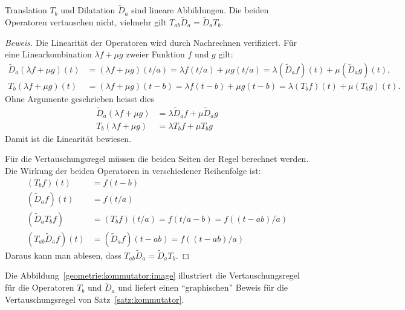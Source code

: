 \begin{satz}
\label{satz:kommutator}
Translation $T_b$ und Dilatation $\tilde{D}_a$ sind lineare Abbildungen.
Die beiden Operatoren vertauschen nicht, vielmehr gilt
$T_{ab}\tilde{D}_a = \tilde{D}_aT_b$.
\end{satz}
%

\begin{proof}[Beweis]
Die Linearität der Operatoren wird durch Nachrechnen verifiziert.
Für eine Linearkombination $\lambda f+\mu g$ zweier Funktion $f$ und $g$ gilt:
\begin{align*}
\tilde{D}_a(\lambda f+\mu g)(t)
&=
(\lambda f+\mu g)(t/a)
=
\lambda f(t/a)+\mu g(t/a)
=
\lambda (\tilde{D}_af)(t)+\mu (\tilde{D}_ag)(t),
\\
T_b(\lambda f+ \mu g)(t)
&=
(\lambda f+\mu g)(t-b)
=
\lambda f(t-b)+\mu g(t-b)
=
\lambda (T_bf)(t)+\mu (T_bg)(t).
\end{align*}
Ohne Argumente geschrieben heisst dies
\begin{align*}
\tilde{D}_a(\lambda f+\mu g) &= \lambda \tilde{D}_af + \mu \tilde{D}_ag
\\
T_b(\lambda f+\mu g) &= \lambda T_bf + \mu T_bg
\end{align*}
Damit ist die Linearität bewiesen.

Für die Vertauschungsregel müssen die beiden Seiten der Regel
berechnet werden.
Die Wirkung der beiden Operatoren in verschiedener Reihenfolge
ist:
\begin{align*}
(T_bf)(t)
&=
f(t-b)
\\
(\tilde{D}_af)(t)
&=
f(t/a)
\\
(\tilde{D}_aT_bf)
&=
(T_bf)(t/a)
=
f(t/a-b)
=
f((t-ab)/a)
\\
(T_{ab}\tilde{D}_a f)(t)
&=
(\tilde{D}_af)(t - ab)
=
f((t-ab)/a)
\end{align*}
Daraus kann man ablesen, dass $T_{ab}\tilde{D}_a=\tilde{D}_aT_b$.
\end{proof}

Die Abbildung~\ref{geometrie:kommutator:image} illustriert die
Vertauschungsregel für die Operatoren $T_b$ und $\tilde{D}_a$ und liefert
einen ``graphischen'' Beweis für die Vertauschungsregel von
Satz~\ref{satz:kommutator}.

%
%
%
